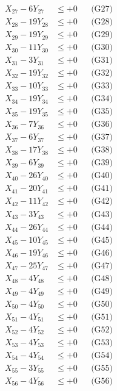 \documentclass[a4paper,10pt]{article}
\begin{document}
{\begin{align}
X_{27} - 6Y_{27} &\leq +0 && \text{(G27)} \\
\allowbreak
X_{28} - 19Y_{28} &\leq +0 && \text{(G28)} \\
X_{29} - 19Y_{29} &\leq +0 && \text{(G29)} \\
X_{30} - 11Y_{30} &\leq +0 && \text{(G30)} \\
X_{31} - 3Y_{31} &\leq +0 && \text{(G31)} \\
X_{32} - 19Y_{32} &\leq +0 && \text{(G32)} \\
X_{33} - 10Y_{33} &\leq +0 && \text{(G33)} \\
X_{34} - 19Y_{34} &\leq +0 && \text{(G34)} \\
X_{35} - 19Y_{35} &\leq +0 && \text{(G35)} \\
X_{36} - 7Y_{36} &\leq +0 && \text{(G36)} \\
X_{37} - 6Y_{37} &\leq +0 && \text{(G37)} \\
\allowbreak
X_{38} - 17Y_{38} &\leq +0 && \text{(G38)} \\
X_{39} - 6Y_{39} &\leq +0 && \text{(G39)} \\
X_{40} - 26Y_{40} &\leq +0 && \text{(G40)} \\
X_{41} - 20Y_{41} &\leq +0 && \text{(G41)} \\
X_{42} - 11Y_{42} &\leq +0 && \text{(G42)} \\
X_{43} - 3Y_{43} &\leq +0 && \text{(G43)} \\
X_{44} - 26Y_{44} &\leq +0 && \text{(G44)} \\
X_{45} - 10Y_{45} &\leq +0 && \text{(G45)} \\
X_{46} - 19Y_{46} &\leq +0 && \text{(G46)} \\
X_{47} - 25Y_{47} &\leq +0 && \text{(G47)} \\
\allowbreak
X_{48} - 4Y_{48} &\leq +0 && \text{(G48)} \\
X_{49} - 4Y_{49} &\leq +0 && \text{(G49)} \\
X_{50} - 4Y_{50} &\leq +0 && \text{(G50)} \\
X_{51} - 4Y_{51} &\leq +0 && \text{(G51)} \\
X_{52} - 4Y_{52} &\leq +0 && \text{(G52)} \\
X_{53} - 4Y_{53} &\leq +0 && \text{(G53)} \\
X_{54} - 4Y_{54} &\leq +0 && \text{(G54)} \\
X_{55} - 3Y_{55} &\leq +0 && \text{(G55)} \\
X_{56} - 4Y_{56} &\leq +0 && \text{(G56)} \\

\end{align}}
\end{document}
